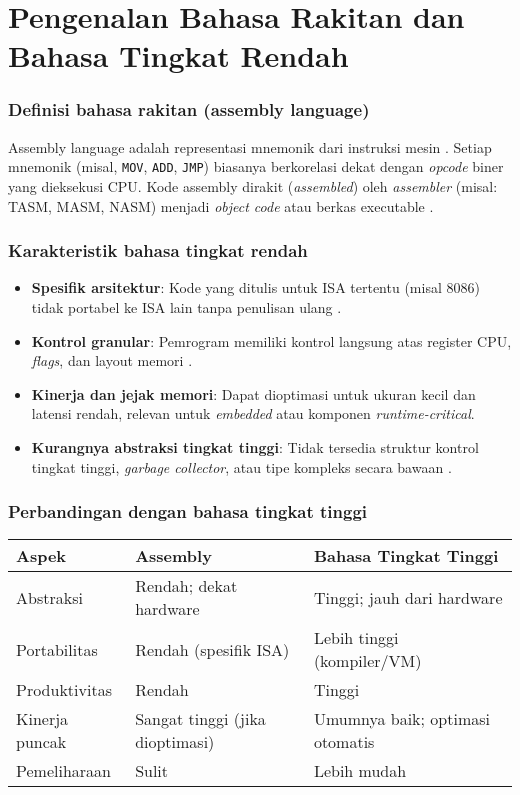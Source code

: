 \section{Pengenalan Bahasa Rakitan dan Bahasa Tingkat Rendah}\label{sec:pengenalan-bahasa}
\subsubsection{Definisi bahasa rakitan (assembly language)}
Assembly language adalah representasi mnemonik dari instruksi mesin \cite{susanto1995belajar}. Setiap mnemonik (misal, \texttt{MOV}, \texttt{ADD}, \texttt{JMP}) biasanya berkorelasi dekat dengan \textit{opcode} biner yang dieksekusi CPU. Kode assembly dirakit (\textit{assembled}) oleh \textit{assembler} (misal: TASM, MASM, NASM) menjadi \textit{object code} atau berkas executable \cite{hyde2010art}.

\subsubsection{Karakteristik bahasa tingkat rendah}
\begin{itemize}
    \item \textbf{Spesifik arsitektur}: Kode yang ditulis untuk ISA tertentu (misal 8086) tidak portabel ke ISA lain tanpa penulisan ulang \cite{susanto1995belajar}.
    \item \textbf{Kontrol granular}: Pemrogram memiliki kontrol langsung atas register CPU, \textit{flags}, dan layout memori \cite{hyde2010art}.
    \item \textbf{Kinerja dan jejak memori}: Dapat dioptimasi untuk ukuran kecil dan latensi rendah, relevan untuk \textit{embedded} atau komponen \textit{runtime-critical}.
    \item \textbf{Kurangnya abstraksi tingkat tinggi}: Tidak tersedia struktur kontrol tingkat tinggi, \textit{garbage collector}, atau tipe kompleks secara bawaan \cite{susanto1995belajar}.
\end{itemize}

\subsubsection{Perbandingan dengan bahasa tingkat tinggi}
\begin{center}
\begin{tabular}{p{} p{} p{}}
\hline
\textbf{Aspek} & \textbf{Assembly} & \textbf{Bahasa Tingkat Tinggi} \\
\hline
Abstraksi & Rendah; dekat hardware & Tinggi; jauh dari hardware \\
Portabilitas & Rendah (spesifik ISA) & Lebih tinggi (kompiler/VM) \\
Produktivitas & Rendah & Tinggi \\
Kinerja puncak & Sangat tinggi (jika dioptimasi) & Umumnya baik; optimasi otomatis \\
Pemeliharaan & Sulit & Lebih mudah \\
\hline
\end{tabular}
\end{center}

